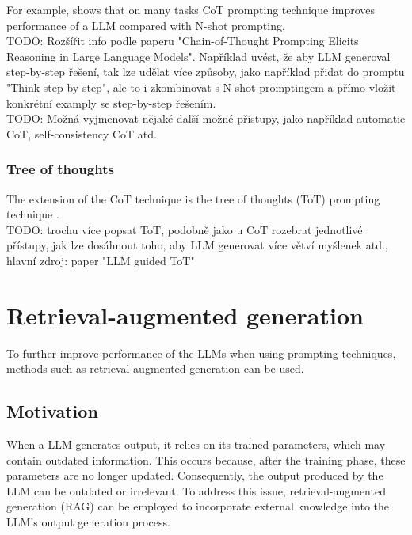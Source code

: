 For example, \citet{Wei2022} shows that on many tasks CoT prompting technique improves performance of a LLM compared with N-shot prompting. \\

TODO: Rozšířit info podle paperu "Chain-of-Thought Prompting Elicits Reasoning in Large Language Models". Například uvést, že aby LLM generoval step-by-step řešení, tak lze udělat více způsoby, jako například přidat do promptu "Think step by step", ale to i zkombinovat s N-shot promptingem a přímo vložit konkrétní examply se step-by-step řešením. \\

TODO: Možná vyjmenovat nějaké další možné přístupy, jako například automatic CoT, self-consistency CoT atd. \\


\subsubsection{Tree of thoughts}

The extension of the CoT technique is the tree of thoughts (ToT) prompting technique \cite{Long2023}. \\

TODO: trochu více popsat ToT, podobně jako u CoT rozebrat jednotlivé přístupy, jak lze dosáhnout toho, aby LLM generovat více větví myšlenek atd., hlavní zdroj: paper "LLM guided ToT" \\


\section{Retrieval-augmented generation}

To further improve performance of the LLMs when using prompting techniques, methods such as retrieval-augmented generation can be used.

\subsection{Motivation}

When a LLM generates output, it relies on its trained parameters, which may contain outdated information. This occurs because, after the training phase, these parameters are no longer updated. Consequently, the output produced by the LLM can be outdated or irrelevant. To address this issue, retrieval-augmented generation (RAG) can be employed to incorporate external knowledge into the LLM's output generation process.



